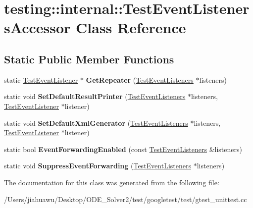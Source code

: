\hypertarget{classtesting_1_1internal_1_1_test_event_listeners_accessor}{}\section{testing\+:\+:internal\+:\+:Test\+Event\+Listeners\+Accessor Class Reference}
\label{classtesting_1_1internal_1_1_test_event_listeners_accessor}
\subsection*{Static Public Member Functions}
\begin{DoxyCompactItemize}
\item 
\mbox{\label{classtesting_1_1internal_1_1_test_event_listeners_accessor_a07c6f8644e509d0f23c0c16a60856387}} 
static \mbox{\hyperlink{classtesting_1_1_test_event_listener}{Test\+Event\+Listener}} $\ast$ {\bfseries Get\+Repeater} (\mbox{\hyperlink{classtesting_1_1_test_event_listeners}{Test\+Event\+Listeners}} $\ast$listeners)
\item 
\mbox{\label{classtesting_1_1internal_1_1_test_event_listeners_accessor_ac8886c7cea5a4ad39aed276d3f58da75}} 
static void {\bfseries Set\+Default\+Result\+Printer} (\mbox{\hyperlink{classtesting_1_1_test_event_listeners}{Test\+Event\+Listeners}} $\ast$listeners, \mbox{\hyperlink{classtesting_1_1_test_event_listener}{Test\+Event\+Listener}} $\ast$listener)
\item 
\mbox{\label{classtesting_1_1internal_1_1_test_event_listeners_accessor_a8c04463b5ba5ee6d6da36e2171c7fff0}} 
static void {\bfseries Set\+Default\+Xml\+Generator} (\mbox{\hyperlink{classtesting_1_1_test_event_listeners}{Test\+Event\+Listeners}} $\ast$listeners, \mbox{\hyperlink{classtesting_1_1_test_event_listener}{Test\+Event\+Listener}} $\ast$listener)
\item 
\mbox{\label{classtesting_1_1internal_1_1_test_event_listeners_accessor_a4a7522557045cb55eb037dc61429d71c}} 
static bool {\bfseries Event\+Forwarding\+Enabled} (const \mbox{\hyperlink{classtesting_1_1_test_event_listeners}{Test\+Event\+Listeners}} \&listeners)
\item 
\mbox{\label{classtesting_1_1internal_1_1_test_event_listeners_accessor_abfc0a0f8163465f4f5d42436ec8c7cb3}} 
static void {\bfseries Suppress\+Event\+Forwarding} (\mbox{\hyperlink{classtesting_1_1_test_event_listeners}{Test\+Event\+Listeners}} $\ast$listeners)
\end{DoxyCompactItemize}


The documentation for this class was generated from the following file\+:\begin{DoxyCompactItemize}
\item 
/\+Users/jiahuawu/\+Desktop/\+O\+D\+E\+\_\+\+Solver2/test/googletest/test/gtest\+\_\+unittest.\+cc\end{DoxyCompactItemize}
